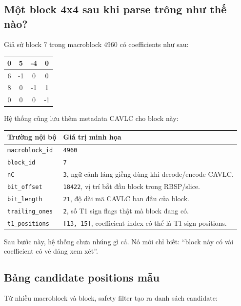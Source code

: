 \documentclass[11pt,a4paper]{article}
\begin{document}
\subsection{Một block 4x4 sau khi parse trông như thế nào?}

Giả sử block 7 trong macroblock 4960 có coefficients như sau:

\begin{center}
\begin{tabular}{|c|c|c|c|}
\hline
0 & 5 & -4 & 0 \\
\hline
6 & -1 & 0 & 0 \\
\hline
8 & 0 & -1 & 1 \\
\hline
0 & 0 & 0 & -1 \\
\hline
\end{tabular}
\end{center}

Hệ thống cũng lưu thêm metadata CAVLC cho block này:

\begin{center}
\begin{tabular}{lp{90mm}}
\toprule
Trường nội bộ & Giá trị minh họa \\
\midrule
\texttt{macroblock\_id} & \texttt{4960} \\
\texttt{block\_id} & \texttt{7} \\
\texttt{nC} & \texttt{3}, ngữ cảnh láng giềng dùng khi decode/encode CAVLC. \\
\texttt{bit\_offset} & \texttt{18422}, vị trí bắt đầu block trong RBSP/slice. \\
\texttt{bit\_length} & \texttt{21}, độ dài mã CAVLC ban đầu của block. \\
\texttt{trailing\_ones} & \texttt{2}, số T1 sign flags thật mà block đang có. \\
\texttt{t1\_positions} & \texttt{[13, 15]}, coefficient index có thể là T1 sign positions. \\
\bottomrule
\end{tabular}
\end{center}

Sau bước này, hệ thống chưa nhúng gì cả. Nó mới chỉ biết: ``block này có vài
coefficient có vẻ đáng xem xét''.

\subsection{Bảng candidate positions mẫu}

Từ nhiều macroblock và block, safety filter tạo ra danh sách candidate:
\end{document}
